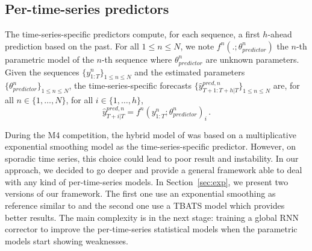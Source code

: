 \documentclass{article} %
\newcommand{\ts}{y}
\newcommand{\tspred}{\hat{\ts}}
\newcommand{\stat}{f}
\newcommand{\statparam}{\theta_{predictor}}
\newcommand{\lag}{h}
\begin{document}
\subsection{Per-time-series predictors}
The time-series-specific predictors compute, for each sequence, a first $\lag$-ahead prediction based on the past. For all $1\leqslant n \leqslant N$, we note $\stat^n(.;\statparam^n)$ the $n$-th parametric model of the $n$-th sequence where $\statparam^n$ are  unknown parameters. Given the sequences $\{\ts^n_{1:T}\}_{1\leqslant n \leqslant N}$ and the estimated  parameters $\{\statparam^n\}_{1\leqslant n \leqslant N}$, the time-series-specific forecasts $\{\tspred^{pred,n}_{T+1:T+\lag|T}\}_{1\leqslant n \leqslant N}$ are, for all $n \in \{1,\ldots,N\}$, for all $i \in \{1,\ldots,\lag\}$,
$$
\tspred^{pred,n}_{T+i|T} = \stat^n(\ts^n_{1:T};\statparam^n)_i\,.
$$

During the M4 competition, the hybrid model of \cite{smyl2020hybrid} was based on a multiplicative exponential smoothing model as the time-series-specific predictor. However, on sporadic time series, this choice could lead to poor result and instability. In our approach, we decided to go deeper and provide a general framework able to deal with any kind of per-time-series models. In Section~\ref{sec:exp}, we present two versions of our framework. The first one use an  exponential smoothing as reference similar to \cite{smyl2020hybrid} and the second one use a TBATS model \cite{doi:10.1198/jasa.2011.tm09771} which provides better results. The main complexity is in the next stage: training a global RNN corrector to improve the per-time-series statistical models when the parametric models start showing weaknesses.
\end{document}
